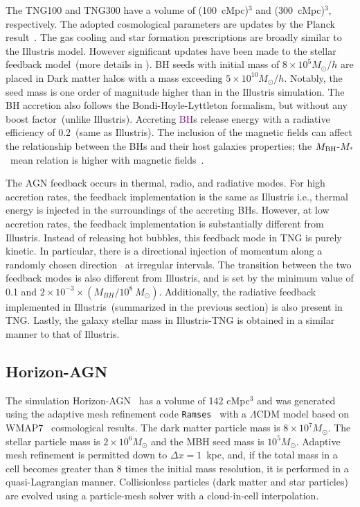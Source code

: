 \documentclass[twocolumn]{aastex631}
\newcommand{\red}[1]{\textcolor{purple}{#1}}
\def\smass{{$M_*$}}
\def\mbh{$M_{\rm BH}$}
\begin{document}
The TNG100 and TNG300 have a volume of (100~cMpc)$^3$ and (300~cMpc)$^3$, respectively. The adopted cosmological parameters are updates by the Planck result~\citep{2016A&A...594A..13P}.
The gas cooling and star formation prescriptions are broadly similar to the Illustris model. However significant updates have been made to the stellar feedback model~(more details in \citealt{2018MNRAS.473.4077P}).
BH seeds with initial mass of $8 \times 10^5 M_{\odot}/h$ are placed in Dark matter halos with a mass exceeding $5 \times 10^{10} M_{\odot}/h$. Notably, the seed mass is one order of magnitude higher than in the Illustris simulation. The BH accretion also follows the Bondi-Hoyle-Lyttleton formalism, but without any boost factor~(unlike Illustris). Accreting \red{BH}s release energy with a radiative efficiency of 0.2~(same as Illustris). The inclusion of the magnetic fields can affect the relationship between the BHs and their host galaxies properties; the \mbh-\smass\ mean relation is higher with magnetic fields~\citep{2018MNRAS.473.4077P}. 

The AGN feedback occurs in thermal, radio, and radiative modes. For high accretion rates, the feedback implementation is the same as Illustris i.e., thermal energy is injected in the surroundings of the accreting BHs. However, at low accretion rates, the feedback implementation is substantially different from Illustris. Instead of releasing hot bubbles, this feedback mode in TNG is purely kinetic. In particular, there is a directional injection of momentum along a randomly chosen direction~\citep{2017MNRAS.465.3291W, 2018MNRAS.479.4056W} at irregular intervals. The transition between the two feedback modes is also different from Illustris, and is set by the minimum value of 0.1 and $2 \times 10 ^{-3} \times (M_{BH} / 10^8~M_{\odot})$. Additionally, the radiative feedback implemented in Illustris~(summarized in the previous section) is also present in TNG. Lastly, the galaxy stellar mass in Illustris-TNG is obtained in a similar manner to that of Illustris.

\subsection{Horizon-AGN}\label{subsec:Horizon}
The simulation Horizon-AGN~\citep{2014MNRAS.444.1453D, 2016MNRAS.463.3948D} has a volume of 142 cMpc$^3$ and was generated using the adaptive mesh refinement code {\tt Ramses}~\citep{2002A&A...385..337T} with a $\Lambda$CDM model based on WMAP7~\citep{2011ApJS..192...18K} cosmological results. The dark matter particle mass is $8\times 10^7 M_{\odot}$. The stellar particle mass is $2\times 10^6 M_{\odot}$ and the MBH seed mass is $10^5 M_{\odot}$. Adaptive mesh refinement is permitted down to $\Delta x=1$~kpc, and, if the total mass in a cell becomes greater than 8 times the initial mass resolution, it is performed in a quasi-Lagrangian manner. Collisionless particles (dark matter and star particles) are evolved using a particle-mesh solver with a cloud-in-cell interpolation.
\end{document}
